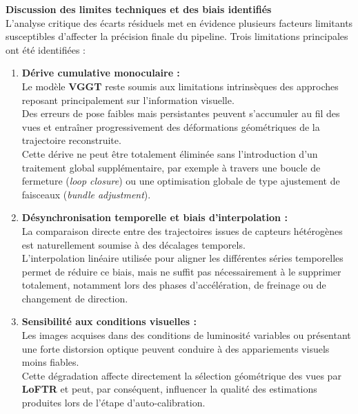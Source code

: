 \documentclass[12pt,a4paper,oneside]{report}
\begin{document}
\par\bigskip
\par\bigskip

\hspace*{0.4cm}\textbf{Discussion des limites techniques et des biais identifiés}\\

\hspace*{.3cm}L'analyse critique des écarts résiduels met en évidence plusieurs facteurs limitants susceptibles d'affecter la précision finale du pipeline. Trois limitations principales ont été identifiées :

\begin{enumerate}[itemsep=0.5em]

    \item \textbf{Dérive cumulative monoculaire :}\\
    Le modèle \textbf{VGGT} reste soumis aux limitations intrinsèques des approches reposant principalement sur l'information visuelle. \\
Des erreurs de pose faibles mais persistantes peuvent s'accumuler au fil des vues et entraîner progressivement des déformations géométriques de la trajectoire reconstruite.\\
    Cette dérive ne peut être totalement éliminée sans l'introduction d'un traitement global supplémentaire, par exemple à travers une boucle de fermeture (\textit{loop closure}) ou une optimisation globale de type ajustement de faisceaux (\textit{bundle adjustment}).

    \item \textbf{Désynchronisation temporelle et biais d'interpolation :}\\
    La comparaison directe entre des trajectoires issues de capteurs hétérogènes est naturellement soumise à des décalages temporels.\\
    L'interpolation linéaire utilisée pour aligner les différentes séries temporelles permet de réduire ce biais, mais ne suffit pas nécessairement à le supprimer totalement, notamment lors des phases d'accélération, de freinage ou de changement de direction.

    \item \textbf{Sensibilité aux conditions visuelles :}\\
    Les images acquises dans des conditions de luminosité variables ou présentant une forte distorsion optique peuvent conduire à des appariements visuels moins fiables.\\
    Cette dégradation affecte directement la sélection géométrique des vues par \textbf{LoFTR} et peut, par conséquent, influencer la qualité des estimations produites lors de l'étape d'auto-calibration.

\end{enumerate}
\end{document}
